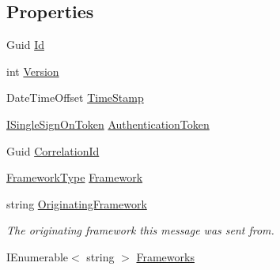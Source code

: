 \subsection*{Properties}
\begin{DoxyCompactItemize}
\item 
Guid \hyperlink{classCqrs_1_1Tests_1_1Substitutes_1_1TestAggregateDidSomething_ac9a5ee87be68aa399f3a9d62e1e4e7ae}{Id}
\item 
int \hyperlink{classCqrs_1_1Tests_1_1Substitutes_1_1TestAggregateDidSomething_a87be89d49da8a13dd5adc5f4212113d1}{Version}
\item 
Date\+Time\+Offset \hyperlink{classCqrs_1_1Tests_1_1Substitutes_1_1TestAggregateDidSomething_af609de5278f3842a61a727bd20a4f22f}{Time\+Stamp}
\item 
\hyperlink{interfaceCqrs_1_1Authentication_1_1ISingleSignOnToken}{I\+Single\+Sign\+On\+Token} \hyperlink{classCqrs_1_1Tests_1_1Substitutes_1_1TestAggregateDidSomething_a1ab4e87506efc47a791b28a1e6e15fd8}{Authentication\+Token}
\item 
Guid \hyperlink{classCqrs_1_1Tests_1_1Substitutes_1_1TestAggregateDidSomething_a859dfc01b70a90392891e5fbb4b6b1ee}{Correlation\+Id}
\item 
\hyperlink{namespaceCqrs_1_1Messages_af06a7e6cd2609043d0f2f5f3419f81e3}{Framework\+Type} \hyperlink{classCqrs_1_1Tests_1_1Substitutes_1_1TestAggregateDidSomething_a6d25ea89af11405c8ada20b841a1fb7a}{Framework}
\item 
string \hyperlink{classCqrs_1_1Tests_1_1Substitutes_1_1TestAggregateDidSomething_ac1a52622a285f1c4d2e226fbb4c91c09}{Originating\+Framework}
\begin{DoxyCompactList}\small\item\em The originating framework this message was sent from. \end{DoxyCompactList}\item 
I\+Enumerable$<$ string $>$ \hyperlink{classCqrs_1_1Tests_1_1Substitutes_1_1TestAggregateDidSomething_af7f1de240f8dc7b1191a08f8f26b61e9}{Frameworks}

\end{DoxyCompactItemize}
